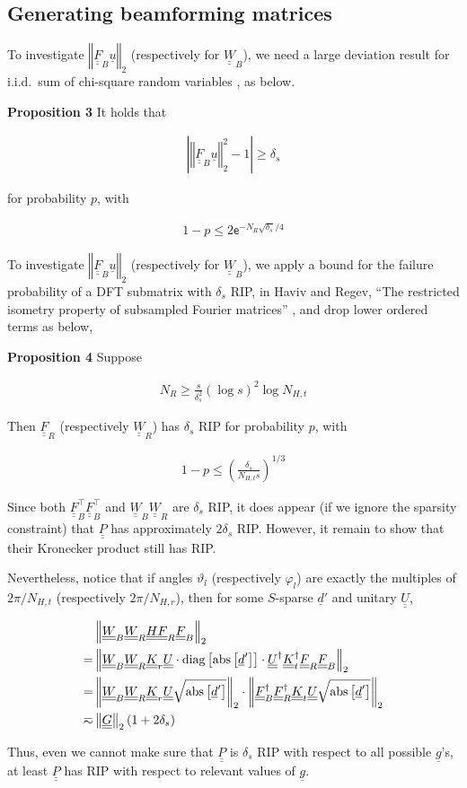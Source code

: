 \documentclass[journal]{IEEEtran}
\renewcommand {\d} {\delta}
\newcommand {\f} {\varphi}
\renewcommand {\th} {\vartheta}
\newcommand {\D} {\cdot}
\newcommand {\Tr} {\intercal}
\newcommand {\m} [1] {\( #1 \)}
\newcommand {\V} [1] {\underline {#1}}
\newcommand {\M} [1] {\underline {\underline {#1}}}
\newcommand {\RB} [1] {\left( #1 \right)}
\newcommand {\SB} [1] {\left[ #1 \right]}
\newcommand {\Nm} [1] {\left \vert #1 \right \vert}
\newcommand {\VNm} [1] {\left \Vert #1 \right \Vert}
\newcommand {\R} [1] {\sqrt {#1}}
\newcommand {\Disp} [1] {
   \begin {align*}
      #1
   \end {align*}
}
\begin{document}

\subsection {Generating beamforming matrices}


To investigate \m {\VNm {\M {F} _B \V {u}} _2} (respectively for \m {\M {W} _B}), we need a large deviation result for i.i.d.\ sum of chi-square random variables \cite {LaM00}, as below.

\textbf {Proposition 3}
It holds that
%
\Disp {
\Nm {\VNm {\M {F} _B \V {u}} _2 ^2 - 1}
\geq \d_s 
}
for probability \m {p}, with
\Disp {
1 -p
\leq 2 \mathsf {e} ^{-N_R \R {\d_s} /4} 
}

To investigate \m {\VNm {\M {F} _B \V {u}} _2} (respectively for \m {\M {W} _B}), we apply a bound for the failure probability of a DFT submatrix with \m {\d_s} RIP, in Haviv and Regev, ``The restricted isometry property of subsampled Fourier matrices'' \cite {KlM17}, and drop lower ordered terms as below,

\textbf {Proposition 4}
Suppose
\Disp {
N_R
\geq \frac {s} {\d_s^2} \RB {\log s}^2 \log N_{H,t}
}
Then \m {\M {F}_R} (respectively \m {\M {W} _R}) has \m {\d_s} RIP for probability \m {p}, with
\Disp {
1 -p
\leq \RB {\frac {\d_s} {N_{H,t} s}} ^{1/3} 
}

Since both \m {\M {F}_B^\Tr \M {F}_B^\Tr} and \m {\M {W}_B \M {W}_R} are \m {\d_s} RIP, it does appear (if we ignore the sparsity constraint) that \m {\M {P}} has approximately \m {2\d_s} RIP.
However, it remain to show that their Kronecker product still has RIP.

Nevertheless, notice that if angles \m {\th_l} (respectively \m {\f_l}) are exactly the multiples of \m {2 \pi / N_{H,t}} (respectively \m {2 \pi / N_{H,r}}), then for some \m {S}-sparse \m {\V {d}'} and unitary \m {\M {U}},
\Disp {
&\VNm {\M {W} _B \M {W} _R \M {H} \M {F} _R \M {F} _B} _2 \notag \\
= &\VNm {
   \M {W} _B \M {W} _R \M {K} _r \M {U} \D
   \mathrm {diag} \SB {\mathrm {abs} \SB {\V {d}'}} \D
   \M {U} ^\dagger \M {K} _t ^\dagger \M {F} _R \M {F} _B} _2 \notag \\
= &\VNm {
   \M {W} _B \M {W} _R \M {K} _r \M {U}
   \R {\mathrm {abs} \SB {\V {d}'}}} _2 \D
   \VNm {\M {F} _B ^\dagger \M {F} _R ^\dagger \M {K} _t \M {U}
   \R {\mathrm {abs} \SB {\V {d}'}}} _2 \notag \\
\eqsim &\VNm {\M {G}} _2 \RB {1 +2\d_s} 
}
Thus, even we cannot make sure that \m {\M {P}} is \m {\d_s} RIP with respect to all possible \m {\V {g}}'s, at least \m {\M {P}} has RIP with respect to relevant values of \m {\V {g}}.
\end{document}
